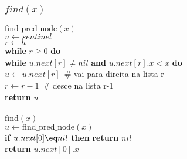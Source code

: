\documentclass{beamer}
\begin{document}
\begin{frame}[shrink]
\frametitle{$find(x)$}
\begin{oframed}
\begin{flushleft}
\ensuremath{\mathrm{find\_pred\_node}(\ensuremath{\mathit{x}})}\\
\hspace*{1em} \ensuremath{\ensuremath{\mathit{u}} \gets  \ensuremath{sentinel}}\\
\hspace*{1em} \ensuremath{\ensuremath{\mathit{r}} \gets  \ensuremath{h}}\\
\hspace*{1em} {\color{black} \textbf{while}} \ensuremath{\ensuremath{\mathit{r}} \ge 0} {\color{black} \textbf{do}} \\
\hspace*{1em} \hspace*{1em} {\color{black} \textbf{while}} \ensuremath{\ensuremath{\mathit{u}}.\ensuremath{\mathit{next}}[\ensuremath{\mathit{r}}] \ne nil} {\color{black} \textbf{and}} \ensuremath{\ensuremath{\mathit{u}}.\ensuremath{\mathit{next}}[\ensuremath{\mathit{r}}].\ensuremath{\mathit{x}} < x} {\color{black} \textbf{do}} \\
\hspace*{1em} \hspace*{1em} \hspace*{1em} \ensuremath{\ensuremath{\mathit{u}} \gets  \ensuremath{\ensuremath{\mathit{u}}.\ensuremath{\mathit{next}}[\ensuremath{\mathit{r}}]}  }\ {\color{blue}\# vai para direita na lista r}\\
\hspace*{1em} \hspace*{1em} \ensuremath{\ensuremath{\mathit{r}} \gets  \ensuremath{\ensuremath{\mathit{r}} - 1}  }\ {\color{blue}\# desce na lista r-1}\\
\hspace*{1em} {\color{black} \textbf{return}} \ensuremath{\ensuremath{\mathit{u}}}\\
\ \\
\ensuremath{\mathrm{find}(\ensuremath{\mathit{x}})}\\
\hspace*{1em} \ensuremath{\ensuremath{\mathit{u}} \gets  \ensuremath{\mathrm{find\_pred\_node}(\ensuremath{\mathit{x}})}}\\
\hspace*{1em} {\color{black} \textbf{if}} \ensuremath{\ensuremath{\mathit{u}}.\ensuremath{\mathit{next}}[0] \eq nil} {\color{black} \textbf{then}}  {\color{black} \textbf{return}} \ensuremath{\ensuremath{\mathit{nil}}}\\
\hspace*{1em} {\color{black} \textbf{return}} \ensuremath{\ensuremath{\mathit{u}}.\ensuremath{\mathit{next}}[0].\ensuremath{\mathit{x}}}\\
\end{flushleft}
\end{oframed}

\end{frame}
\end{document}
